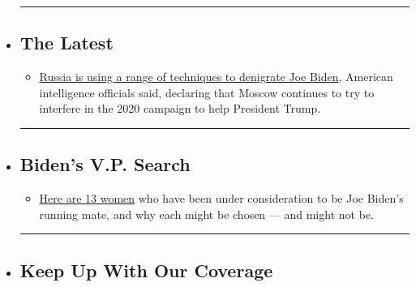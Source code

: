 \begin{itemize}
\item
  \begin{center}\rule{0.5\linewidth}{\linethickness}\end{center}

  \hypertarget{the-latest}{%
  \subsection{The Latest}\label{the-latest}}

  \begin{itemize}
  \tightlist
  \item
    \href{https://www.nytimes.com/2020/08/07/us/politics/russia-china-trump-biden-election-interference.html?action=click\&pgtype=Article\&state=default\&region=BELOW_MAIN_CONTENT\&context=storylines_guide}{Russia
    is using a range of techniques to denigrate Joe Biden}, American
    intelligence officials said, declaring that Moscow continues to try
    to interfere in the 2020 campaign to help President Trump.
  \end{itemize}
\item
  \begin{center}\rule{0.5\linewidth}{\linethickness}\end{center}

  \hypertarget{bidens-vp-search}{%
  \subsection{Biden's V.P. Search}\label{bidens-vp-search}}

  \begin{itemize}
  \tightlist
  \item
    \href{https://www.nytimes.com/article/biden-vice-president-2020.html?action=click\&pgtype=Article\&state=default\&region=BELOW_MAIN_CONTENT\&context=storylines_guide}{Here
    are 13 women} who have been under consideration to be Joe Biden's
    running mate, and why each might be chosen --- and might not be.
  \end{itemize}
\item
  \begin{center}\rule{0.5\linewidth}{\linethickness}\end{center}

  \hypertarget{keep-up-with-our-coverage}{%
  \subsection{Keep Up With Our
  Coverage}\label{keep-up-with-our-coverage}}


\end{itemize}
